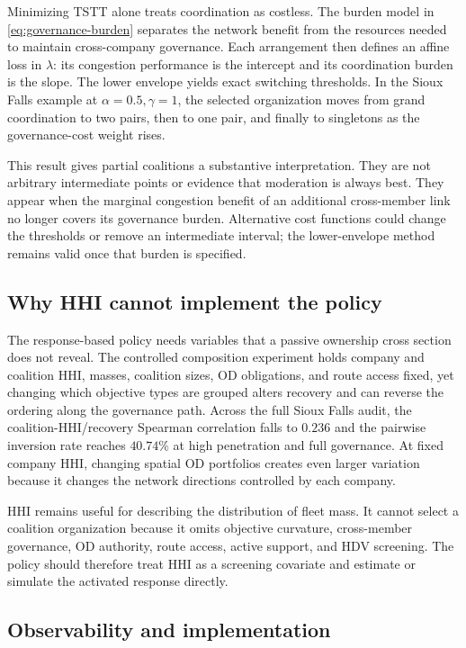 Minimizing TSTT alone treats coordination as costless. The burden model in
\eqref{eq:governance-burden} separates the network benefit from the resources
needed to maintain cross-company governance. Each arrangement then defines an
affine loss in $\lambda$: its congestion performance is the intercept and its
coordination burden is the slope. The lower envelope yields exact switching
thresholds. In the Sioux Falls example at $\alpha=0.5,\gamma=1$, the selected
organization moves from grand coordination to two pairs, then to one pair, and
finally to singletons as the governance-cost weight rises.

This result gives partial coalitions a substantive interpretation. They are not
arbitrary intermediate points or evidence that moderation is always best.
They appear when the marginal congestion benefit of an additional cross-member
link no longer covers its governance burden. Alternative cost functions could
change the thresholds or remove an intermediate interval; the lower-envelope
method remains valid once that burden is specified.

\subsection{Why HHI cannot implement the policy}

The response-based policy needs variables that a passive ownership cross
section does not reveal. The controlled composition experiment holds company
and coalition HHI, masses, coalition sizes, OD obligations, and route access
fixed, yet changing which objective types are grouped alters recovery and can
reverse the ordering along the governance path. Across the full Sioux Falls
audit, the coalition-HHI/recovery Spearman correlation falls to $0.236$ and the
pairwise inversion rate reaches $40.74\%$ at high penetration and full
governance. At fixed company HHI, changing spatial OD portfolios creates even
larger variation because it changes the network directions controlled by each
company.

HHI remains useful for describing the distribution of fleet mass. It cannot
select a coalition organization because it omits objective curvature,
cross-member governance, OD authority, route access, active support, and HDV
screening. The policy should therefore treat HHI as a screening covariate and
estimate or simulate the activated response directly.

\subsection{Observability and implementation}


